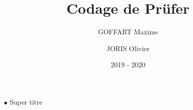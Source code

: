 \documentclass[11pt]{beamer}
\author[GOFFART M. \and JORIS O.]{GOFFART Maxime \and JORIS Olivier}
\title{Codage de Prüfer}
\date{2019 - 2020}
\begin{document}
\begin{frame}
\titlepage
\end{frame}


\begin{frame}{$\bullet$ Super titre}

\end{frame}
\end{document}
